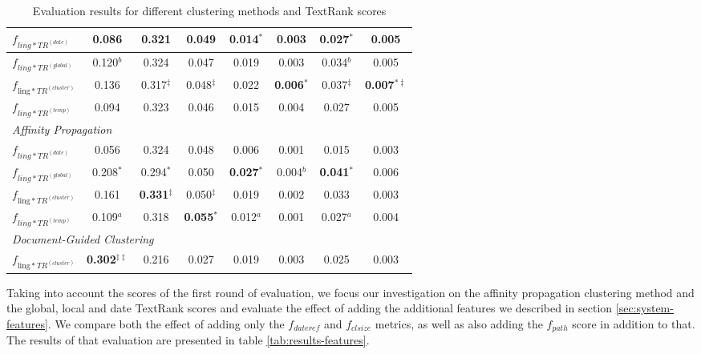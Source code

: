 \documentclass[a4paper,BCOR=10mm]{report}
\numberwithin{lemma}{chapter}
\numberwithin{definition}{chapter}
\begin{document}
\begin{table}
\begin{centering}
{\begin{tabular}{|l|c|cc|cc|cc|}
$f_{ling*TR^{(date)}}$   & 0.086    & 0.321 & 0.049 & 0.014$^{*}$   & 0.003 & 0.027$^{*}$   & 0.005 \\\hline
$f_{ling*TR^{(global)}}$     & 0.120$^{b}$  & 0.324 & 0.047 & 0.019 & 0.003 & 0.034$^{b}$   & 0.005 \\\hline
$f_{\text{ling}*TR^{(cluster)}}$     & 0.136    & 0.317$^{\ddagger}$    & 0.048$^{\ddagger}$    & 0.022 & \textbf{0.006}$^{*}$  & 0.037$^{\ddagger}$    & \textbf{0.007}$^{*\ddagger}$ \\\hline
$f_{ling*TR^{(temp)}}$   & 0.094    & 0.323 & 0.046 & 0.015 & 0.004 & 0.027 & 0.005 \\\hline
\multicolumn{8}{|l|}{ \textit{Affinity Propagation} }\\\hline
$f_{ling*TR^{(date)}}$   & 0.056    & 0.324 & 0.048 & 0.006 & 0.001 & 0.015 & 0.003 \\\hline
$f_{ling*TR^{(global)}}$     & 0.208$^{*}$  & 0.294$^{*}$   & 0.050 & \textbf{0.027}$^{*}$  & 0.004$^{b}$   & \textbf{0.041}$^{*}$  & 0.006 \\\hline
$f_{\text{ling}*TR^{(cluster)}}$     & 0.161    & \textbf{0.331}$^{\ddagger}$   & 0.050$^{\ddagger}$    & 0.019 & 0.002 & 0.033 & 0.003 \\\hline
$f_{ling*TR^{(temp)}}$   & 0.109$^{a}$  & 0.318 & \textbf{0.055}$^{*}$  & 0.012$^{a}$   & 0.001 & 0.027$^{a}$   & 0.004 \\\hline
\multicolumn{8}{|l|}{ \textit{Document-Guided Clustering} }\\\hline
$f_{\text{ling}*TR^{(cluster)}}$     & \textbf{0.302}$^{\ddagger\ddagger}$  & 0.216 & 0.027 & 0.019 & 0.003 & 0.025 & 0.003 \\\hline
\end{tabular}
}
\end{centering}
\caption{Evaluation results for different clustering methods and TextRank scores}
\label{tab:eval-cl-tr}
\end{table}


Taking into account the scores of the first round of evaluation, we focus our investigation on the affinity propagation clustering method and the global, local and date TextRank scores and evaluate the effect of adding the additional features we described in section \ref{sec:system-features}.
We compare both the effect of adding only the $f_{dateref}$ and $f_{clsize}$ metrics, as well as also adding the $f_{path}$ score in addition to that.
The results of that evaluation are presented in table \ref{tab:results-features}.
\end{document}

